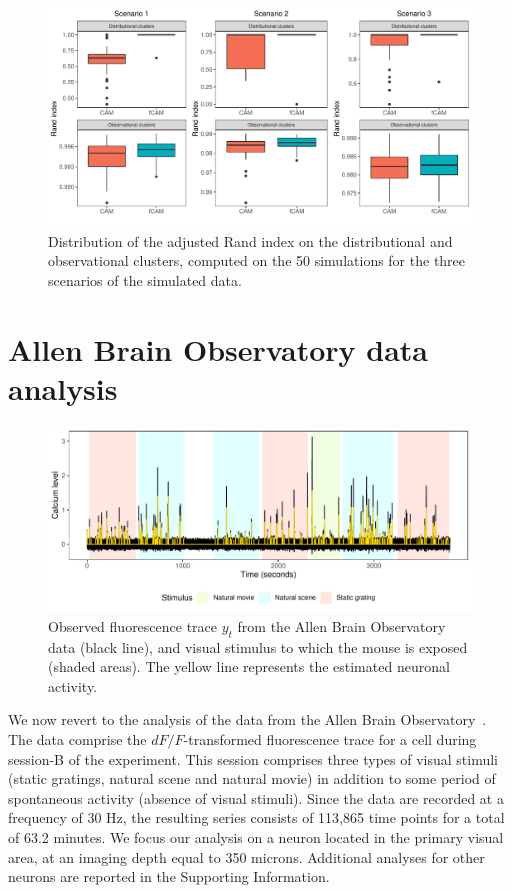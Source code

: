 \begin{figure}
	\centerline{\includegraphics[width = .9\linewidth]{_Images/ch3_rand_index.pdf}}
	\caption{Distribution of the adjusted Rand index on the distributional and observational clusters, computed on the 50 simulations for the three scenarios of the simulated data.}
	\label{fig:rand_index}
\end{figure}



\section{Allen Brain Observatory data analysis}
\label{s:dataanalysis}

\begin{figure}
	\centerline{\includegraphics[width = \linewidth]{_Images/ch3_plot_data_new.pdf}}
	\caption{Observed fluorescence trace $y_t$ from the Allen Brain Observatory data (black line), and visual stimulus to which the mouse is exposed (shaded areas). The yellow line represents the estimated neuronal activity.}
	\label{fig:y}
\end{figure}

We now revert to the analysis of the data from the Allen Brain Observatory~\citep{allen}. The data comprise the $dF/F$-transformed fluorescence trace for a cell during session-B of the experiment. This session comprises three types of visual stimuli (static gratings, natural scene and natural movie) in addition to some period of spontaneous activity (absence of visual stimuli). Since the data are recorded at a frequency of $30$ Hz, the resulting series consists of 113{,}865 time points for a total of 63.2 minutes. 
We focus our analysis on a neuron located in the primary visual area, at an imaging depth equal to 350 microns. Additional analyses for other neurons are reported in the Supporting Information.

